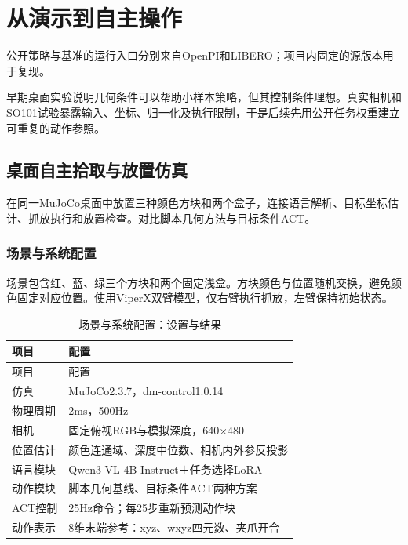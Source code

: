 \chapter{从演示到自主操作}
公开策略与基准的运行入口分别来自OpenPI\cite{openpi}和LIBERO\cite{libero}；项目内固定的源版本用于复现。


早期桌面实验说明几何条件可以帮助小样本策略，但其控制条件理想。真实相机和SO101试验暴露输入、坐标、归一化及执行限制，于是后续先用公开任务权重建立可重复的动作参照。

\section{桌面自主拾取与放置仿真}

\label{stage:s05}

在同一MuJoCo桌面中放置三种颜色方块和两个盒子，连接语言解析、目标坐标估计、抓放执行和放置检查。对比脚本几何方法与目标条件ACT。

\subsection{场景与系统配置}\label{s05-detail-1}

场景包含红、蓝、绿三个方块和两个固定浅盒。方块颜色与位置随机交换，避免颜色固定对应位置。使用ViperX双臂模型，仅右臂执行抓放，左臂保持初始状态。

\FloatBarrier\begingroup\small\setlength{\tabcolsep}{2.5pt}
\begin{longtable}[]{@{}
  >{\raggedright\arraybackslash}p{}
  >{\raggedright\arraybackslash}p{}@{}}
\caption{场景与系统配置：设置与结果}\label{tab:s05-1}\tabularnewline
\toprule\noalign{}
\begin{minipage}[b]{\linewidth}\raggedright
项目
\end{minipage} & \begin{minipage}[b]{\linewidth}\raggedright
配置
\end{minipage} \\
\midrule\noalign{}
\endfirsthead
\toprule\noalign{}
\begin{minipage}[b]{\linewidth}\raggedright
项目
\end{minipage} & \begin{minipage}[b]{\linewidth}\raggedright
配置
\end{minipage} \\
\midrule\noalign{}
\endhead
\bottomrule\noalign{}
\endlastfoot
仿真 & MuJoCo2.3.7，dm-control1.0.14 \\
物理周期 & 2ms，500Hz \\
相机 & 固定俯视RGB与模拟深度，640\(\times\)480 \\
位置估计 & 颜色连通域、深度中位数、相机内外参反投影 \\
语言模块 & Qwen3-VL-4B-Instruct＋任务选择LoRA \\
动作模块 & 脚本几何基线、目标条件ACT两种方案 \\
ACT控制 & 25Hz命令；每25步重新预测动作块 \\
动作表示 & 8维末端参考：xyz、wxyz四元数、夹爪开合 \\
\end{longtable}\endgroup

